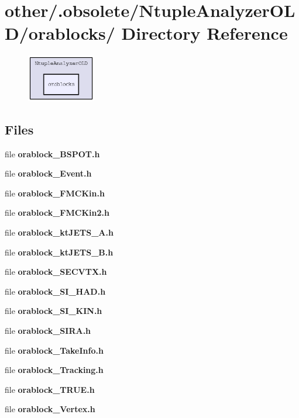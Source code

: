 \section{other/.obsolete/Ntuple\-Analyzer\-OLD/orablocks/ Directory Reference}
\label{dir_74b21be851836b73a558a664dd47bd15}


\begin{figure}[H]
\begin{center}
\leavevmode
\includegraphics[width=85pt]{dir_74b21be851836b73a558a664dd47bd15_dep}
\end{center}
\end{figure}
\subsection*{Files}
\begin{CompactItemize}
\item 
file \textbf{orablock\_\-BSPOT.h}
\item 
file \textbf{orablock\_\-Event.h}
\item 
file \textbf{orablock\_\-FMCKin.h}
\item 
file \textbf{orablock\_\-FMCKin2.h}
\item 
file \textbf{orablock\_\-kt\-JETS\_\-A.h}
\item 
file \textbf{orablock\_\-kt\-JETS\_\-B.h}
\item 
file \textbf{orablock\_\-SECVTX.h}
\item 
file \textbf{orablock\_\-SI\_\-HAD.h}
\item 
file \textbf{orablock\_\-SI\_\-KIN.h}
\item 
file \textbf{orablock\_\-SIRA.h}
\item 
file \textbf{orablock\_\-Take\-Info.h}
\item 
file \textbf{orablock\_\-Tracking.h}
\item 
file \textbf{orablock\_\-TRUE.h}
\item 
file \textbf{orablock\_\-Vertex.h}
\end{CompactItemize}

